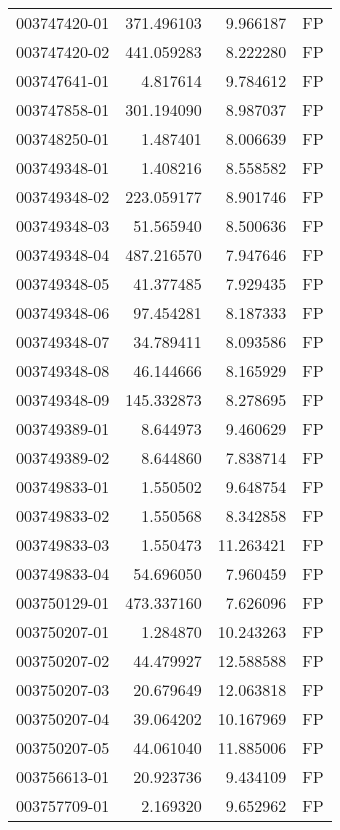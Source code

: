 \begin{tabular}{lrrl}
003747420-01 &  371.496103 &       9.966187 &   FP \\
003747420-02 &  441.059283 &       8.222280 &   FP \\
003747641-01 &    4.817614 &       9.784612 &   FP \\
003747858-01 &  301.194090 &       8.987037 &   FP \\
003748250-01 &    1.487401 &       8.006639 &   FP \\
003749348-01 &    1.408216 &       8.558582 &   FP \\
003749348-02 &  223.059177 &       8.901746 &   FP \\
003749348-03 &   51.565940 &       8.500636 &   FP \\
003749348-04 &  487.216570 &       7.947646 &   FP \\
003749348-05 &   41.377485 &       7.929435 &   FP \\
003749348-06 &   97.454281 &       8.187333 &   FP \\
003749348-07 &   34.789411 &       8.093586 &   FP \\
003749348-08 &   46.144666 &       8.165929 &   FP \\
003749348-09 &  145.332873 &       8.278695 &   FP \\
003749389-01 &    8.644973 &       9.460629 &   FP \\
003749389-02 &    8.644860 &       7.838714 &   FP \\
003749833-01 &    1.550502 &       9.648754 &   FP \\
003749833-02 &    1.550568 &       8.342858 &   FP \\
003749833-03 &    1.550473 &      11.263421 &   FP \\
003749833-04 &   54.696050 &       7.960459 &   FP \\
003750129-01 &  473.337160 &       7.626096 &   FP \\
003750207-01 &    1.284870 &      10.243263 &   FP \\
003750207-02 &   44.479927 &      12.588588 &   FP \\
003750207-03 &   20.679649 &      12.063818 &   FP \\
003750207-04 &   39.064202 &      10.167969 &   FP \\
003750207-05 &   44.061040 &      11.885006 &   FP \\
003756613-01 &   20.923736 &       9.434109 &   FP \\
003757709-01 &    2.169320 &       9.652962 &   FP \\

\end{tabular}
